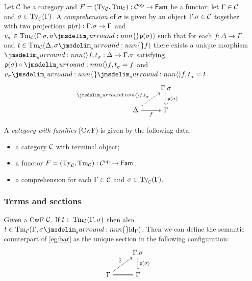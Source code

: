 \documentclass[a4paper]{article}
\begin{document}
\begin{definition}
  Let $\mathcal{C}$ be a category and $F = (\operatorname{Ty}_{\mathcal{C}},\operatorname{Tm}_{\mathcal{C}}) : \mathcal{C}^{\mathrm{op}} \to \mathsf{Fam}$ be a functor; let $\Gamma \in \mathcal{C}$ and $\sigma \in \operatorname{Ty}_{\mathcal{C}}(\Gamma)$.
  A \emph{comprehension} of $\sigma$ is given by an object $\Gamma.\sigma \in \mathcal{C}$ together with two projections $\operatorname{\mathsf{p}}(\sigma) : \Gamma.\sigma \to \Gamma$ and $v_{\sigma} \in \Tm{\cC}(\Gamma.\sigma, \semSubst{\sigma}{\ctxP(\sigma)})$ such that for each $f : \Delta \to \Gamma$ and $t \in \Tm{\cC}(\Delta,\semSubst{\sigma}{f})$ there exists a unique morphism $\semComp{f}{t}{\sigma} : \Delta \to \Gamma.\sigma$ satisfying $\ctxP(\sigma) \circ \semComp{f}{t}{\sigma} = f$ and $\semSubst{v_{\sigma}}{\semComp{f}{t}{\sigma}} = t$.
  \[\begin{tikzcd}
      & {\Gamma.\sigma} \\
      \Delta & \Gamma
      \arrow["{\ctxP(\sigma)}", from=1-2, to=2-2]
      \arrow["{\semComp{f}{t}{\sigma}}", dashed, from=2-1, to=1-2]
      \arrow["f"', from=2-1, to=2-2]
    \end{tikzcd}\]
\end{definition}

\begin{definition}
  A \emph{category with families} (CwF) is given by the following data:
  \begin{itemize}
  \item a category $\mathcal{C}$ with terminal object;
  \item a functor $F = (\operatorname{Ty}_{\mathcal{C}},\operatorname{Tm}_{\mathcal{C}}) : \mathcal{C}^{\mathrm{op}} \to \mathsf{Fam}$;
  \item a comprehension for each $\Gamma \in \mathcal{C}$ and $\sigma \in \operatorname{Ty}_{\mathcal{C}}(\Gamma)$.
  \end{itemize}
\end{definition}

\subsubsection{Terms and sections}\label{sec:tas}

Given a CwF $\mathcal{C}$.
If $t \in \operatorname{Tm}_{\mathcal{C}}(\Gamma,\sigma)$ then also $t \in \Tm{\cC}(\Gamma,\semSubst{\sigma}{\id{\Gamma}})$.
Then we can define the semantic counterpart of \cref{eg:bar} as the unique section in the following configuration:
\[\begin{tikzcd}
    & {\Gamma.\sigma} \\
    \Gamma & \Gamma
    \arrow["{\ctxP(\sigma)}", from=1-2, to=2-2]
    \arrow["{\overline{t}}", from=2-1, to=1-2]
    \arrow[equals, from=2-1, to=2-2]
  \end{tikzcd}\]
\end{document}
